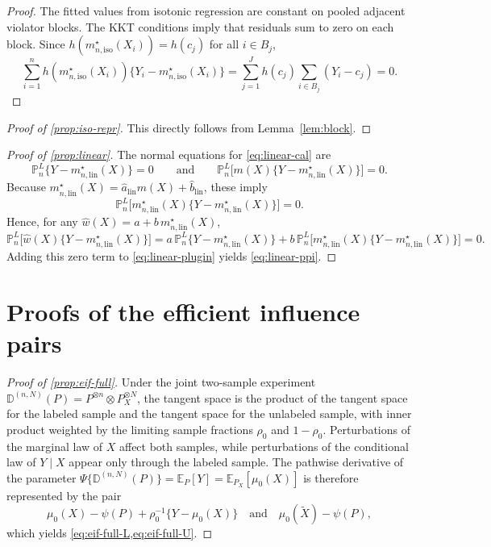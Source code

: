 \documentclass{article}
\theoremstyle{plain}
\theoremstyle{definition}
\newcommand{\E}{\mathbb{E}}
\newcommand{\1}{\mathbbm{1}}
\newcommand{\mhat}{m}
\newcommand{\rhozero}{\rho_0}
\newcommand{\muzero}{\mu_0}
\newcommand{\Pl}{\mathbb{P}^{L}_n}
\begin{document}
\begin{proof}
The fitted values from isotonic regression are constant on pooled adjacent violator blocks. The KKT conditions imply that residuals sum to zero on each block. Since \(h(m_{n,\mathrm{iso}}^\star(X_i))=h(c_j)\) for all \(i \in B_j\),
\[
\sum_{i=1}^n h(m_{n,\mathrm{iso}}^\star(X_i))\{Y_i-m_{n,\mathrm{iso}}^\star(X_i)\}
=
\sum_{j=1}^J h(c_j)\sum_{i \in B_j}(Y_i-c_j)
=
0.
\]
\end{proof}

\begin{proof}[Proof of \cref{prop:iso-repr}]
This directly follows from Lemma~\ref{lem:block}.
\end{proof}

\begin{proof}[Proof of \cref{prop:linear}]
The normal equations for \cref{eq:linear-cal} are
\[
\Pl\{Y-m_{n,\mathrm{lin}}^\star(X)\}=0
\qquad\text{and}\qquad
\Pl\bigl[\mhat(X)\{Y-m_{n,\mathrm{lin}}^\star(X)\}\bigr]=0.
\]
Because \(m_{n,\mathrm{lin}}^\star(X)=\hat a_{\mathrm{lin}}\mhat(X)+\hat b_{\mathrm{lin}}\), these imply
\[
\Pl\bigl[m_{n,\mathrm{lin}}^\star(X)\{Y-m_{n,\mathrm{lin}}^\star(X)\}\bigr]=0.
\]
Hence, for any \(\hat w(X)=a+b\,m_{n,\mathrm{lin}}^\star(X)\),
\[
\Pl\bigl[\hat w(X)\{Y-m_{n,\mathrm{lin}}^\star(X)\}\bigr]
=
a\,\Pl\{Y-m_{n,\mathrm{lin}}^\star(X)\}
+
b\,\Pl\bigl[m_{n,\mathrm{lin}}^\star(X)\{Y-m_{n,\mathrm{lin}}^\star(X)\}\bigr]
=
0.
\]
Adding this zero term to \cref{eq:linear-plugin} yields \cref{eq:linear-ppi}.
\end{proof}

\section{Proofs of the efficient influence pairs}
\label{app:eif}

\begin{proof}[Proof of \cref{prop:eif-full}]
Under the joint two-sample experiment \(\mathbb D^{(n,N)}(P)=P^{\otimes n}\otimes P_X^{\otimes N}\), the tangent space is the product of the tangent space for the labeled sample and the tangent space for the unlabeled sample, with inner product weighted by the limiting sample fractions \(\rhozero\) and \(1-\rhozero\). Perturbations of the marginal law of \(X\) affect both samples, while perturbations of the conditional law of \(Y \mid X\) appear only through the labeled sample. The pathwise derivative of the parameter \(\Psi\{\mathbb D^{(n,N)}(P)\}=\E_P[Y]=\E_{P_X}[\muzero(X)]\) is therefore represented by the pair
\[
\muzero(X)-\psi(P)+\rhozero^{-1}\{Y-\muzero(X)\}
\quad\text{and}\quad
\muzero(\widetilde X)-\psi(P),
\]
which yields \cref{eq:eif-full-L,eq:eif-full-U}.
\end{proof}
\end{document}
